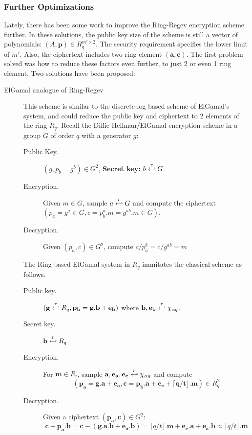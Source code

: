\subsubsection{Further Optimizations}
\label{sec:furtherOptimizations}
Lately, there has been some work to improve the Ring-Regev encryption scheme
further. In these solutions, the public key size of the scheme is still a vector of
polynomials: $(A,\mathbf{p}) \in R_{q}^{m' \times 2}$. The security requirement
specifies the lower limit of $m'$. Also, the ciphertext includes two ring
element $(\mathbf{a,c})$. The first problem solved was how to reduce these
factors even further, to just 2 or even 1 ring element. Two solutions have been
proposed:
\begin{description}
\item[ElGamal analogue of Ring-Regev \cite{lyubashevsky2010ideal}] This scheme
  is similar to the discrete-log based scheme of ElGamal's system, and could reduce the
  public key and ciphertext to 2 elements of the ring $R_q$. Recall the
  Diffie-Hellman/ElGamal encryption scheme in a group $G$ of order $q$ with a
  generator $g$:
  \begin{description}
  \item[Public Key.] $(g, p_b = g^b) \in G^2$, \textbf{Secret key:}
    $b \stackrel{r}{\hookleftarrow} G$.
  \item [Encryption.] Given $m \in G$, sample $a \stackrel{r}{\hookleftarrow} G$ and compute
    the ciphertext $(p_a = g^a \in G, c = p_b^a.m = g^{ab}.m \in G)$.
  \item [Decryption.] Given $(p_a, c) \in G^2$, compute $c/p_a^b = c/g^{ab} = m$
  \end{description}
  The Ring-based ElGamal system in $R_q$ immitates the classical scheme as
  follows.
  \begin{description}
  \item[Public key.] $(\mathbf{g} \stackrel{r}{\hookleftarrow} R_q, \mathbf{p_b = g.b + e_b})$
    where $\mathbf{b,e_b} \stackrel{r}{\hookleftarrow} \chi_{\alpha q}$.
  \item [Secret key.] $\mathbf{b} \stackrel{r}{\hookleftarrow} R_q$
  \item [Encryption.] For $\mathbf{m} \in R_t$, sample
    $\mathbf{a,e_a,e_c} \stackrel{r}{\hookleftarrow} \chi_{\alpha q}$ and
    compute
    $$(\mathbf{p_a = g.a + e_a}, \mathbf{c = p_b.a + e_c + \lceil q/t \rfloor
      . m}) \in R_q^2$$
  \item [Decryption.] Given a ciphertext $(\mathbf{p_a,c}) \in G^2$:
    \[
      \mathbf{c - p_a.b = c - (g.a.b + e_a.b)} = \lceil q/t \rfloor .\mathbf{m}
      + \mathbf{e_c.a} + \mathbf{e_a.b} \approx \lceil q/t \rfloor.\mathbf{m}
\]
\end{description}
\end{description}
